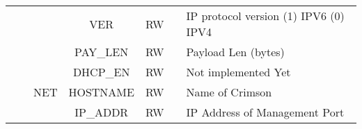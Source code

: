 \documentclass[11pt]{article}
\begin{document}
{\begin{landscape}
\begin{table}[H]
\begin{tabular}{|c|c|c|c|c|c|l|}
                       &                         &                        & VER       & RW                &             & IP protocol version (1) IPV6 (0) IPV4                                 \\ \cline{4-7} 
                       &                         &                        & PAY\_LEN  & RW                &             & Payload Len (bytes)                                                   \\ \cline{3-7} 
                       &                         & \multirow{3}{*}{NET}   & DHCP\_EN  & RW                &             & Not implemented Yet                                                   \\ \cline{4-7} 
                       &                         &                        & HOSTNAME  & RW                &             & Name of Crimson                                                       \\ \cline{4-7} 
                       &                         &                        & IP\_ADDR  & RW                &             & IP Address of Management Port                                         \\ \hline
\end{tabular}
\end{table}


    \end{landscape}
    \clearpage%
}
\end{document}
